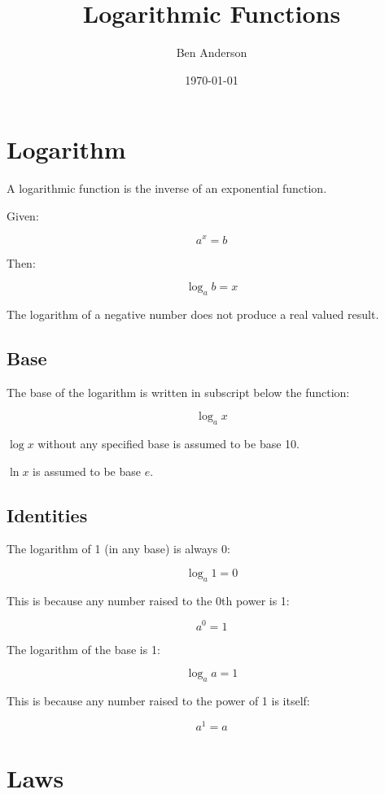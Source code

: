 \documentclass[a4paper,11pt]{article}
\begin{document}
\title{Logarithmic Functions}
\author{Ben Anderson}
\date{\today}
\maketitle
\pagebreak

\tableofcontents
\pagebreak


\section{Logarithm}

A logarithmic function is the inverse of an exponential function.

Given:

$$
a^x = b
$$

Then:

$$
\log_a{b} = x
$$

The logarithm of a negative number does not produce a real valued result.


\subsection{Base}

The base of the logarithm is written in subscript below the function:

$$
\log_a{x}
$$

$\log{x}$ without any specified base is assumed to be base 10.

$\ln{x}$ is assumed to be base $e$.


\subsection{Identities}

The logarithm of 1 (in any base) is always 0:

$$
\log_a{1} = 0
$$

This is because any number raised to the 0th power is 1:

$$
a^0 = 1
$$

The logarithm of the base is 1:

$$
\log_a{a} = 1
$$

This is because any number raised to the power of 1 is itself:

$$
a^1 = a
$$



\section{Laws}
\end{document}
